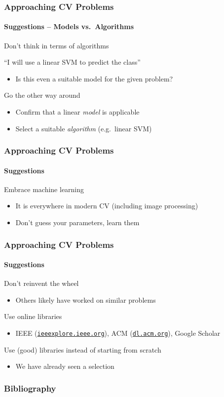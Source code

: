 \documentclass[xetex,professionalfont]{beamer}
\let\oldemph\emph
\renewcommand\emph[1]{\textcolor{tuwcvl_inf_red}{#1}}
\begin{document}
\begin{frame}
\frametitle{Approaching CV Problems}
\framesubtitle{Suggestions -- Models vs.\ Algorithms}

Don't think in terms of algorithms

\bigskip
\enquote{I will use a linear SVM to predict the class}
\begin{itemize}
    \item Is this even a suitable model for the given problem?
\end{itemize}

\bigskip
Go the other way around
\begin{itemize}
    \item Confirm that a linear \textit{model} is applicable
    \item Select a suitable \textit{algorithm} (e.g.\ linear SVM)
\end{itemize}

\end{frame}


\begin{frame}
\frametitle{Approaching CV Problems}
\framesubtitle{Suggestions}

Embrace machine learning
\begin{itemize}
    \item It is everywhere in modern CV (including image processing)
    \item Don't guess your parameters, learn them
\end{itemize}

\end{frame}


\begin{frame}
\frametitle{Approaching CV Problems}
\framesubtitle{Suggestions}

Don't reinvent the wheel
\begin{itemize}
    \item Others likely have worked on similar problems
\end{itemize}

\bigskip
Use online libraries
\begin{itemize}
    \item IEEE (\href{http://ieeexplore.ieee.org/}{\texttt{ieeexplore.ieee.org}}), ACM (\href{http://dl.acm.org/}{\texttt{dl.acm.org}}), Google Scholar
\end{itemize}

\bigskip
Use (good) libraries instead of starting from scratch
\begin{itemize}
    \item We have already seen a selection
\end{itemize}

\end{frame}


\renewcommand\emph[1]{\oldemph{#1}}

\begin{frame}
\frametitle{Bibliography}

\printbibliography

\end{frame}
\end{document}
